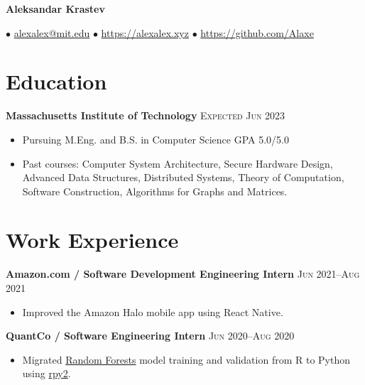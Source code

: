 \documentclass[letterpaper,11pt]{article}
\author{Aleksandar Krastev}
\date{2020-12-21}
\begin{document}
\setlength{\belowdisplayskip}{\parskip}
\setlength{\belowdisplayshortskip}{\belowdisplayskip}
\setlength{\abovedisplayskip}{\parskip}
\setlength{\abovedisplayshortskip}{\abovedisplayskip}

\centerline{{\Huge \bf Aleksandar Krastev}}
$\bullet$ \href{mailto:alexalex@mit.edu}{alexalex@mit.edu} \hfill
$\bullet$ \href{https://alexalex.xyz}{https://alexalex.xyz} \hfill
$\bullet$ \href{https://github.com/Alaxe}{https://github.com/Alaxe} \hfill

\section*{Education}
\textbf{Massachusetts Institute of Technology}
\hfill
\textsc{Expected Jun 2023}

\begin{itemize}
    \item Pursuing M.Eng. and B.S. in Computer Science
        \hfill GPA 5.0/5.0
    \item Past courses:
        Computer System Architecture,
        Secure Hardware Design,
        Advanced Data Structures,
        Distributed Systems,
        Theory of Computation,
        Software Construction,
        Algorithms for Graphs and Matrices.
\end{itemize}



\section*{Work Experience}
\textbf{Amazon.com / Software Development Engineering Intern}
\hfill
\textsc{Jun 2021--Aug 2021}
\begin{itemize}
    \item Improved the Amazon Halo mobile app using React Native.
\end{itemize}

\textbf{QuantCo / Software Engineering Intern}
\hfill
\textsc{Jun 2020--Aug 2020}
\begin{itemize}
    \item Migrated \href{https://grf-labs.github.io/}{Random Forests} model
        training and validation from R to Python using
        \href{https://rpy2.github.io/}{rpy2}.
\end{itemize}
\end{document}
